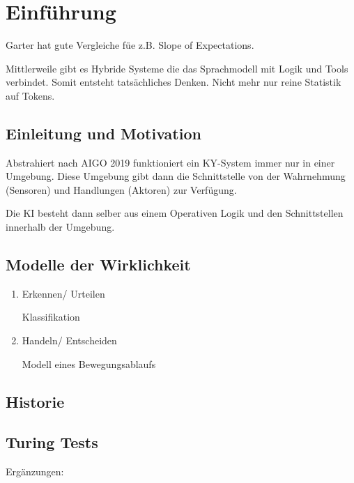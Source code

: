 \documentclass[a4paper]{article}
\title{\docTitle}
\author{Moritz}
\date{\today}
\begin{document}
\maketitle
\tableofcontents


\section{Einführung}

Garter hat gute Vergleiche füe z.B. Slope of Expectations.

Mittlerweile gibt es Hybride Systeme die das Sprachmodell mit Logik und Tools verbindet. Somit entsteht tatsächliches Denken. Nicht mehr nur reine Statistik auf Tokens.

\subsection{Einleitung und Motivation}

Abstrahiert nach AIGO 2019 funktioniert ein KY-System immer nur in einer Umgebung. Diese Umgebung gibt dann die Schnittstelle von der Wahrnehmung (Sensoren) und Handlungen (Aktoren) zur Verfügung.

Die KI besteht dann selber aus einem Operativen Logik und den Schnittstellen innerhalb der Umgebung.

\subsection{Modelle der Wirklichkeit}

\begin{enumerate} 
    \item Erkennen/ Urteilen
          
    Klassifikation
    \item Handeln/ Entscheiden
    
    Modell eines Bewegungsablaufs
\end{enumerate}

\subsection{Historie}

\subsection{Turing Tests}

Ergänzungen: 
\end{document}
